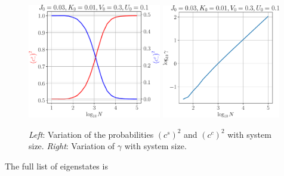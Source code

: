 \documentclass[12pt,twoside]{report}
\numberwithin{equation}{section}
\begin{document}
\begin{figure}[htbp]
	\centering
	\includegraphics[width=0.52\textwidth]{../figures/cscc_q1.pdf}
	\includegraphics[width=0.46\textwidth]{../figures/gamma_q1.pdf}
	\caption{\textit{Left}: Variation of the probabilities \(\left(c^s\right)^2\) and \(\left(c^c\right)^2\) with system size. \textit{Right}: Variation of \(\gamma\) with system size.}
	\label{gamma}
\end{figure}
\pb The full list of eigenstates is
\end{document}

